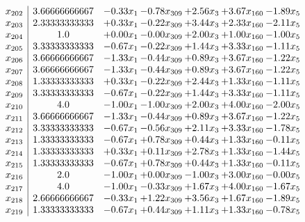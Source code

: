 \documentclass[8pt]{article}
\begin{document}
\[\begin{array}{c| c c@{\hskip 2pt} c@{\hskip 2pt} c@{\hskip 2pt} c@{\hskip 2pt} c@{\hskip 2pt} }
 x_{202}   &  3.66666666667 & -0.33 x_{1} & -0.78 x_{309} & +  2.56 x_{3} & +  3.67 x_{160} & -1.89 x_{5}\\
 x_{203}   &  2.33333333333 & +  0.33 x_{1} & -0.22 x_{309} & +  3.44 x_{3} & +  2.33 x_{160} & -2.11 x_{5}\\
 x_{204}   &  1.0 & +  0.00 x_{1} & -0.00 x_{309} & +  2.00 x_{3} & +  1.00 x_{160} & -1.00 x_{5}\\
 x_{205}   &  3.33333333333 & -0.67 x_{1} & -0.22 x_{309} & +  1.44 x_{3} & +  3.33 x_{160} & -1.11 x_{5}\\
 x_{206}   &  3.66666666667 & -1.33 x_{1} & -0.44 x_{309} & +  0.89 x_{3} & +  3.67 x_{160} & -1.22 x_{5}\\
 x_{207}   &  3.66666666667 & -1.33 x_{1} & -0.44 x_{309} & +  0.89 x_{3} & +  3.67 x_{160} & -1.22 x_{5}\\
 x_{208}   &  1.33333333333 & +  0.33 x_{1} & -0.22 x_{309} & +  2.44 x_{3} & +  1.33 x_{160} & -1.11 x_{5}\\
 x_{209}   &  3.33333333333 & -0.67 x_{1} & -0.22 x_{309} & +  1.44 x_{3} & +  3.33 x_{160} & -1.11 x_{5}\\
 x_{210}   &  4.0 & -1.00 x_{1} & -1.00 x_{309} & +  2.00 x_{3} & +  4.00 x_{160} & -2.00 x_{5}\\
 x_{211}   &  3.66666666667 & -1.33 x_{1} & -0.44 x_{309} & +  0.89 x_{3} & +  3.67 x_{160} & -1.22 x_{5}\\
 x_{212}   &  3.33333333333 & -0.67 x_{1} & -0.56 x_{309} & +  2.11 x_{3} & +  3.33 x_{160} & -1.78 x_{5}\\
 x_{213}   &  1.33333333333 & -0.67 x_{1} & +  0.78 x_{309} & +  0.44 x_{3} & +  1.33 x_{160} & -0.11 x_{5}\\
 x_{214}   &  1.33333333333 & +  0.33 x_{1} & +  0.11 x_{309} & +  2.78 x_{3} & +  1.33 x_{160} & -1.44 x_{5}\\
 x_{215}   &  1.33333333333 & -0.67 x_{1} & +  0.78 x_{309} & +  0.44 x_{3} & +  1.33 x_{160} & -0.11 x_{5}\\
 x_{216}   &  2.0 & -1.00 x_{1} & +  0.00 x_{309} & -1.00 x_{3} & +  3.00 x_{160} & -0.00 x_{5}\\
 x_{217}   &  4.0 & -1.00 x_{1} & -0.33 x_{309} & +  1.67 x_{3} & +  4.00 x_{160} & -1.67 x_{5}\\
 x_{218}   &  2.66666666667 & -0.33 x_{1} & +  1.22 x_{309} & +  3.56 x_{3} & +  1.67 x_{160} & -1.89 x_{5}\\
 x_{219}   &  1.33333333333 & -0.67 x_{1} & +  0.44 x_{309} & +  1.11 x_{3} & +  1.33 x_{160} & -0.78 x_{5}\\

\end{array}\]
\end{document}

